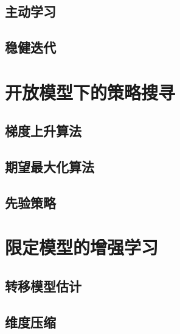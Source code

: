 \section{主动学习}
\section{稳健迭代}


\chapter{开放模型下的策略搜寻} 
\section{梯度上升算法}
\section{期望最大化算法}
\section{先验策略}

\chapter{限定模型的增强学习} 
\section{转移模型估计}
\section{维度压缩}

